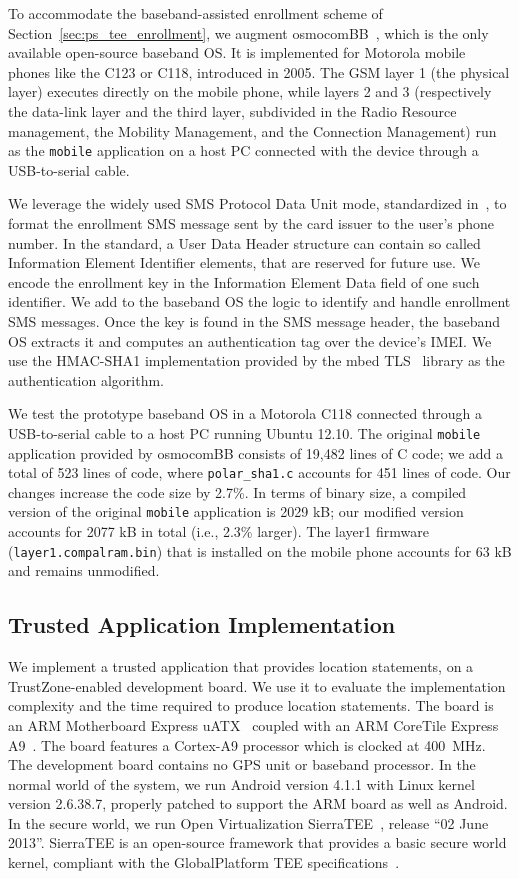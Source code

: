 To accommodate the baseband-assisted enrollment scheme of
Section~\ref{sec:ps_tee_enrollment}, we augment osmocomBB~\cite{osmocombb}, which is
the only available open-source baseband OS. It is implemented for Motorola
mobile phones like the C123 or C118, introduced in 2005.  The GSM layer 1 (the
physical layer) executes directly on the mobile phone, while layers 2 and 3
(respectively the data-link layer and the third layer, subdivided in the Radio
Resource management, the Mobility Management, and the Connection Management) run
as the \texttt{mobile} application on a host PC connected with the device
through a USB-to-serial cable.

We leverage the widely used SMS Protocol Data Unit mode, standardized
in~\cite{3gppsms}, to format the enrollment SMS message sent by the card issuer
to the user's phone number. In the standard, a User Data Header structure can
contain so called Information Element Identifier elements, that are reserved for
future use. We encode the enrollment key in the Information Element Data field
of one such identifier.  We add to the baseband OS the logic to identify and
handle enrollment SMS messages.  Once the key is found in the SMS message
header, the baseband OS extracts it and computes an authentication tag over the
device's IMEI.  We use the HMAC-SHA1 implementation provided by the
mbed TLS~\cite{polarssl} library as the authentication algorithm.

We test the prototype baseband OS in a Motorola C118 connected through a
USB-to-serial cable to a host PC running Ubuntu 12.10.  The original
\texttt{mobile} application provided by osmocomBB consists of 19,482 lines of C
code; we add a total of 523 lines of code, where \texttt{polar\_sha1.c} accounts
for 451 lines of code.  Our changes increase the code size by 2.7\%.  In terms
of binary size, a compiled version of the original \texttt{mobile} application
is 2029 kB; our modified version accounts for 2077 kB in total (i.e., 2.3\%
larger). The layer1 firmware (\texttt{layer1.compalram.bin}) that is installed
on the mobile phone accounts for 63 kB and remains unmodified.

\subsection{Trusted Application Implementation}

We implement a trusted application that provides location statements, on a
TrustZone-enabled development board.  We use it to evaluate the implementation
complexity and the time required to produce location statements. The board is an
ARM Motherboard Express uATX~\cite{armmbexpress} coupled with an ARM CoreTile
Express A9~\cite{armctexpress}. The board features a Cortex-A9 processor which
is clocked at 400~MHz. The development board contains no GPS unit or baseband
processor. In the normal world of the system, we run Android version 4.1.1 with
Linux kernel version 2.6.38.7, properly patched to support the ARM board as well
as Android. In the secure world, we run Open Virtualization
SierraTEE~\cite{openvirtualization}, release ``02 June 2013''. SierraTEE is an
open-source framework that provides a basic secure world kernel, compliant with
the GlobalPlatform TEE specifications~\cite{globalplatformspecs}.

